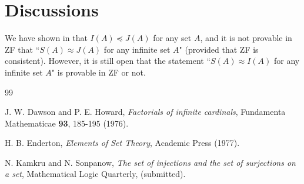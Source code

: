 \documentclass[a4paper,12pt,review]{article} %
\theoremstyle{definition}
\numberwithin{equation}{section}
\begin{document}
\section{Discussions}

We have shown in \cite{my} that $I(A)\preceq J(A)$ for any set $A$, and it is not provable in ZF that ``$S(A)\approx J(A)$ for any infinite set $A$" (provided that ZF is consistent). However, it is still open that the statement ``$S(A)\approx I(A)$ for any infinite set $A$" is provable in ZF or not.



\begin{thebibliography}{99}




J. W. Dawson and P. E. Howard, {\it Factorials of infinite cardinals}, Fundamenta Mathematicae \textbf{93}, 185-195 (1976).

H. B. Enderton, {\it Elements of Set Theory}, Academic Press (1977).

N. Kamkru and N. Sonpanow, {\it The set of injections and the set of surjections on a set}, Mathematical Logic Quarterly, (submitted).










\end{thebibliography}
\end{document}
